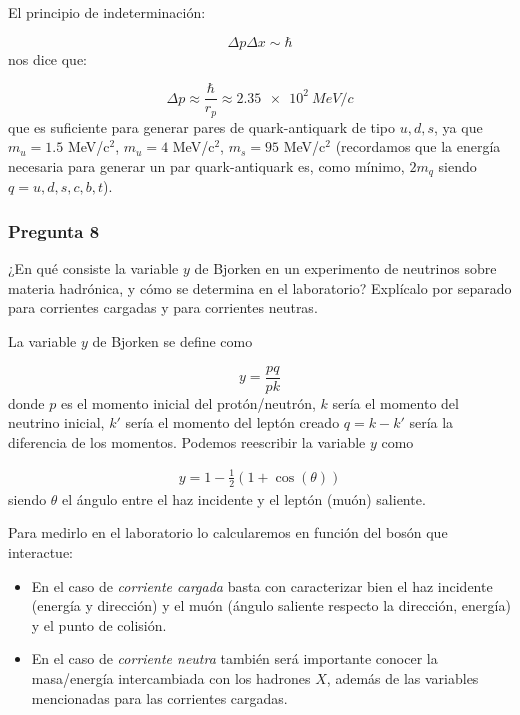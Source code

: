 El principio de indeterminación:

\begin{equation}
    \Delta p \Delta x \sim \hbar
\end{equation}
nos dice que:

\begin{equation}
    \Delta p \approx \frac{\hbar}{r_p} \approx \SI{2.35e+2}{MeV/c}
\end{equation}
que es suficiente para generar pares de quark-antiquark de tipo $u,d,s$, ya que $m_u=1.5$ MeV/c$^2$, $m_u=4$ MeV/c$^2$, $m_s=95$ MeV/c$^2$ (recordamos que la energía necesaria para generar un par quark-antiquark es, como mínimo, $2m_{q}$ siendo $q=u,d,s,c,b,t$).

\vspace*{2em}

\begin{Enunciado}
	\subsubsection*{Pregunta 8}

	¿En qué consiste la variable $y$ de Bjorken en un experimento de neutrinos sobre materia hadrónica, y cómo se determina en el laboratorio? Explícalo por separado para corrientes cargadas y para corrientes neutras.

\end{Enunciado}

La variable $y$ de Bjorken se define como

\begin{equation}
    y = \frac{pq}{pk}
\end{equation}
donde $p$ es el momento inicial del protón/neutrón, $k$ sería el momento del neutrino inicial, $k'$ sería el momento del leptón creado $q=k-k'$ sería la diferencia de los momentos. Podemos reescribir la variable $y$ como

\begin{eqnarray}
    y = 1 - \frac{1}{2} (1+\cos (\theta))
\end{eqnarray}
siendo $\theta$ el ángulo entre el haz incidente y el leptón (muón) saliente. 

Para medirlo en el laboratorio lo calcularemos en función del bosón que interactue:

\begin{itemize}
    \item En el caso de \textit{corriente cargada} basta con caracterizar bien el haz incidente (energía y dirección) y el muón (ángulo saliente respecto la dirección, energía) y el punto de colisión. 
    \item En el caso de \textit{corriente neutra} también será importante conocer la masa/energía intercambiada con los hadrones $X$, además de las variables mencionadas para las corrientes cargadas.
\end{itemize}

